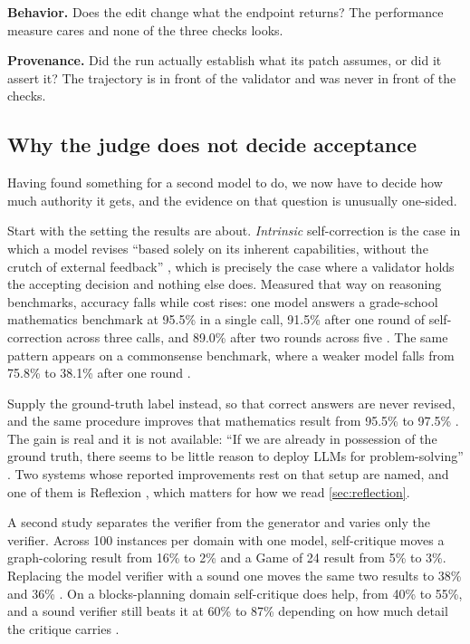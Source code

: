 \item \textbf{Behavior.} Does the edit change what the endpoint returns? The performance measure
cares and none of the three checks looks.

\item \textbf{Provenance.} Did the run actually establish what its patch assumes, or did it assert
it? The trajectory is in front of the validator and was never in front of the checks.

\ei

\subsection{Why the judge does not decide acceptance}
\label{sec:validation-evidence}

Having found something for a second model to do, we now have to decide how much authority it gets,
and the evidence on that question is unusually one-sided.

Start with the setting the results are about. \emph{Intrinsic} self-correction is the case in which
a model revises ``based solely on its inherent capabilities, without the crutch of external
feedback'' \citep[\S1]{huang2024selfcorrect}, which is precisely the case where a validator holds
the accepting decision and nothing else does. Measured that way on reasoning benchmarks, accuracy
falls while cost rises: one model answers a grade-school mathematics benchmark at 95.5\% in a single
call, 91.5\% after one round of self-correction across three calls, and 89.0\% after two rounds
across five \citep[Table~3]{huang2024selfcorrect}. The same pattern appears on a commonsense
benchmark, where a weaker model falls from 75.8\% to 38.1\% after one round
\citep[Table~3]{huang2024selfcorrect}.

Supply the ground-truth label instead, so that correct answers are never revised, and the same
procedure improves that mathematics result from 95.5\% to 97.5\%
\citep[Table~2]{huang2024selfcorrect}. The gain is real and it is not available: ``If we are already
in possession of the ground truth, there seems to be little reason to deploy LLMs for
problem-solving'' \citep[\S3]{huang2024selfcorrect}. Two systems whose reported improvements rest on
that setup are named, and one of them is Reflexion \citep[Table~1]{huang2024selfcorrect}, which
matters for how we read \cref{sec:reflection}.

A second study separates the verifier from the generator and varies only the verifier. Across 100
instances per domain with one model, self-critique moves a graph-coloring result from 16\% to 2\%
and a Game of 24 result from 5\% to 3\%. Replacing the model verifier with a sound one moves the
same two results to 38\% and 36\% \citep[Table~1]{stechly2025selfverification}. On a
blocks-planning domain self-critique does help, from 40\% to 55\%, and a sound verifier still beats
it at 60\% to 87\% depending on how much detail the critique carries
\citep[Table~1]{stechly2025selfverification}.

